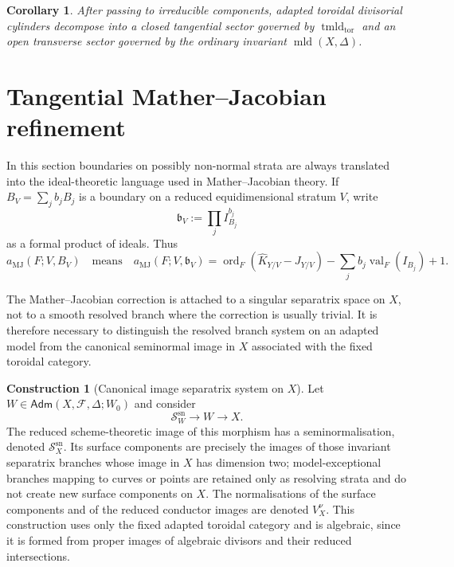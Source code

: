 \documentclass[11pt]{amsart}
\numberwithin{equation}{section}
\theoremstyle{plain}
\newtheorem{Corollary}[Theorem]{Corollary}
\theoremstyle{definition}
\newtheorem{Construction}[Theorem]{Construction}
\newcommand{\ord}{\operatorname{ord}}
\newcommand{\val}{\operatorname{val}}
\newcommand{\mld}{\operatorname{mld}}
\newcommand{\tmldtor}{\operatorname{tmld}_{\mathrm{tor}}}
\newcommand{\MJ}{\mathrm{MJ}}
\newcommand{\sn}{\mathrm{sn}}
\newcommand{\bbound}{\mathfrak b}
\newcommand{\Adm}{\mathsf{Adm}}
\newcommand{\cF}{\mathcal F}
\newcommand{\sS}{\mathscr S}
\begin{document}
\begin{Corollary}
After passing to irreducible components, adapted toroidal divisorial cylinders decompose into a closed tangential sector governed by $\tmldtor$ and an open transverse sector governed by the ordinary invariant $\mld(X,\Delta)$.
\end{Corollary}



\section{Tangential Mather--Jacobian refinement}
\label{sec:mj}

In this section boundaries on possibly non-normal strata are always translated into the ideal-theoretic language used in Mather--Jacobian theory.  If
$
B_V=\sum_j b_jB_j
$
is a boundary on a reduced equidimensional stratum $V$, write
\begin{equation}\label{eq:mj-boundary-ideal}
\bbound_V:=\prod_j I_{B_j}^{b_j}
\end{equation}
as a formal product of ideals.  Thus
\[
a_{\MJ}(F;V,B_V)
\quad\text{means}\quad
a_{\MJ}(F;V,\bbound_V)
=\ord_F(\widehat K_{Y/V}-J_{Y/V})-\sum_j b_j\val_F(I_{B_j})+1.
\]

The Mather--Jacobian correction is attached to a singular separatrix space on
$X$, not to a smooth resolved branch where the correction is usually trivial.
It is therefore necessary to distinguish the resolved branch system on an adapted model from
the canonical seminormal image in $X$ associated with the fixed toroidal
category.


\begin{Construction}[Canonical image separatrix system on $X$]
\label{const:downstairs-sep}
Let $W\in\Adm(X,\cF,\Delta;W_0)$ and consider
\[
\sS_W^{\sn}\longrightarrow W\longrightarrow X.
\]
The reduced scheme-theoretic image of this morphism has a seminormalisation,
denoted $\sS_X^{\sn}$.  Its surface components are precisely the images of
those invariant separatrix branches whose image in $X$ has dimension two;
model-exceptional branches mapping to curves or points are retained only as
resolving strata and do not create new surface components on $X$.  The
normalisations of the surface components and of the reduced conductor images
are denoted $V_X^\nu$.  This construction uses only the fixed adapted
toroidal category and is algebraic, since it is formed from proper images of
algebraic divisors and their reduced intersections.
\end{Construction}
\end{document}
